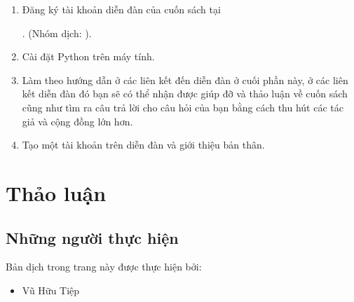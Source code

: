 \documentclass[letterpaper,11pt,english]{sphinxmanual}
\begin{document}
\begin{enumerate}
%
\item {} 
Đăng ký tài khoản diễn đàn của cuốn sách tại
%
\begin{footnote}[23]\sphinxAtStartFootnote
{}
%
\end{footnote}. (Nhóm dịch:
).

\item {} 
Cài đặt Python trên máy tính.

\item {} 
Làm theo hướng dẫn ở các liên kết đến diễn đàn ở cuối phần này, ở các
liên kết diễn đàn đó bạn sẽ có thể nhận được giúp đỡ và thảo luận về
cuốn sách cũng như tìm ra câu trả lời cho câu hỏi của bạn bằng cách
thu hút các tác giả và cộng đồng lớn hơn.

\item {} 
Tạo một tài khoản trên diễn đàn và giới thiệu bản thân.

\end{enumerate}




\section{Thảo luận\sphinxfootnotemark[24]}
\label{\detokenize{chapter_preface/index_vn:thao-luan}}%
\begin{footnotetext}[24]\sphinxAtStartFootnote
{}
%
\end{footnotetext}\ignorespaces 


\begin{figure}[H]
\centering
\capstart

\noindent{}
\caption{}\label{\detokenize{chapter_preface/index_vn:id6}}\end{figure}




\subsection{Những người thực hiện}
\label{\detokenize{chapter_preface/index_vn:nhung-nguoi-thuc-hien}}
Bản dịch trong trang này được thực hiện bởi:


\begin{itemize}
\item {} 
Vũ Hữu Tiệp

\end{itemize}
\end{document}
